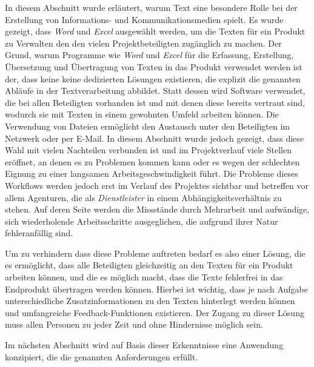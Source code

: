 In diesem Abschnitt wurde erläutert, warum Text eine besondere Rolle bei der Erstellung von Informations- und Kommunikationsmedien spielt. Es wurde gezeigt, dass \emph{Word} und \emph{Excel} ausgewählt werden, um die Texten für ein Produkt zu Verwalten den den vielen Projektbeteiligten zugänglich zu machen. Der Grund, warum Programme wie \emph{Word} und \emph{Excel} für die Erfassung, Erstellung, Übersetzung und Übertragung von Texten in das Produkt verwendet werden ist der, dass keine keine dedizierten Lösungen existieren, die explizit die genannten Abläufe in der Textverarbeitung abbildet. Statt dessen wird Software verwendet, die bei allen Beteiligten vorhanden ist und mit denen diese bereits vertraut sind, wodurch sie mit Texten in einem gewohnten Umfeld arbeiten können. Die Verwendung von Dateien ermöglicht den Austausch unter den Beteiligten im Netzwerk oder per E-Mail. In diesem Abschnitt wurde jedoch gezeigt, dass diese Wahl mit vielen Nachteilen verbunden ist und im Projektverlauf viele Stellen eröffnet, an denen es zu Problemen kommen kann oder es wegen der schlechten Eignung zu einer langsamen Arbeitsgeschwindigkeit führt. Die Probleme dieses Workflows werden jedoch erst im Verlauf des Projektes sichtbar und betreffen vor allem Agenturen, die als \emph{Dienstleister} in einem Abhängigkeitsverhältnis zu stehen. Auf deren Seite werden die Missstände durch Mehrarbeit und aufwändige, sich wiederholende Arbeitsschritte ausgeglichen, die aufgrund ihrer Natur fehleranfällig sind.

Um zu verhindern dass diese Probleme auftreten bedarf es also einer Lösung, die es ermöglicht, dass alle Beteiligten gleichzeitig an den Texten für ein Produkt arbeiten können, und die es möglich macht, dass die Texte fehlerfrei in das Endprodukt übertragen werden können. Hierbei ist wichtig, dass je nach Aufgabe unterschiedliche Zusatzinformationen zu den Texten hinterlegt werden können und umfangreiche Feedback-Funktionen existieren. Der Zugang zu dieser Lösung muss allen Personen zu jeder Zeit und ohne Hindernisse möglich sein. 

\bigskip

Im nächsten Abschnitt wird auf Basis dieser Erkenntnisse eine Anwendung konzipiert, die die genannten Anforderungen erfüllt.
